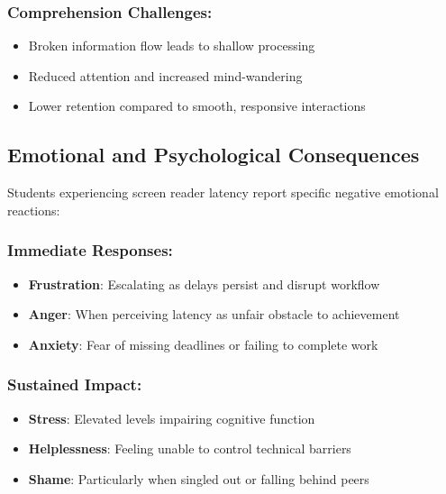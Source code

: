 \subsubsection{Comprehension Challenges:}

\begin{itemize}
	\item Broken information flow leads to shallow processing \supercite{Craik1972LevelsOfProcessing}
	\item Reduced attention and increased mind-wandering \supercite{Smallwood2011MindWandering}
	\item Lower retention compared to smooth, responsive interactions \supercite{Kintsch1998Comprehension}
\end{itemize}

\subsection{Emotional and Psychological Consequences}\label{emotional-and-psychological-consequences}

Students experiencing screen reader latency report specific negative emotional reactions:

\subsubsection{Immediate Responses:}

\begin{itemize}
	\item \textbf{Frustration}: Escalating as delays persist and disrupt workflow \supercite{Lazarus1991EmotionAndAdaptation}
	\item \textbf{Anger}: When perceiving latency as unfair obstacle to achievement \supercite{Fogg2003PersuasiveTechnology}
	\item \textbf{Anxiety}: Fear of missing deadlines or failing to complete work \supercite{Zeidner1998TestAnxiety}
\end{itemize}


\subsubsection{Sustained Impact:}

\begin{itemize}
	\item \textbf{Stress}: Elevated levels impairing cognitive function \supercite{Sapolsky2004WhyZebrasDontGetUlcers}
	\item \textbf{Helplessness}: Feeling unable to control technical barriers \supercite{Seligman1975Helplessness}
	\item \textbf{Shame}: Particularly when singled out or falling behind peers \supercite{Brown2010TheGiftsOfImperfection}
\end{itemize}


